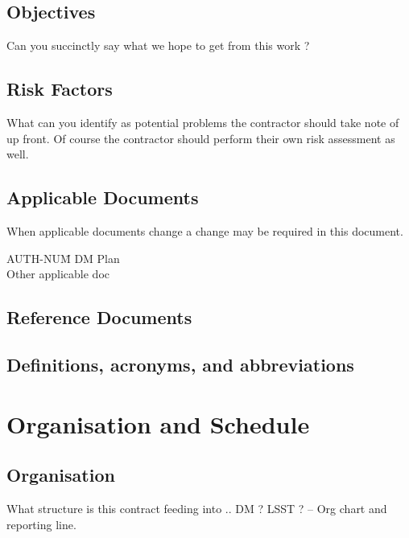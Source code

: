 \documentclass[DM,lsstdraft,SOW]{lsstdoc}
\begin{document}
\subsection{Objectives }
Can you succinctly say what we hope to get from this work ?

\subsection{Risk Factors}
What can you identify as potential problems the contractor should take note of up front. Of course the contractor should perform their own risk assessment as well.


\subsection{Applicable Documents \label{sect:ad}}
When applicable documents change a change may be required in this document.
\begin{tabbing}
AUTH-NUM\= \kill 
{} \>	DM Plan  \\
\>	Other applicable doc \\
\end{tabbing}

\subsection{Reference Documents}

\renewcommand{\refname}{}



\subsection{Definitions, acronyms, and abbreviations \label{sect:acronyms}} 


\section{Organisation and Schedule }


\subsection{Organisation}
What structure is this contract feeding into .. DM ? LSST ? -- Org chart and reporting line.
\end{document}
